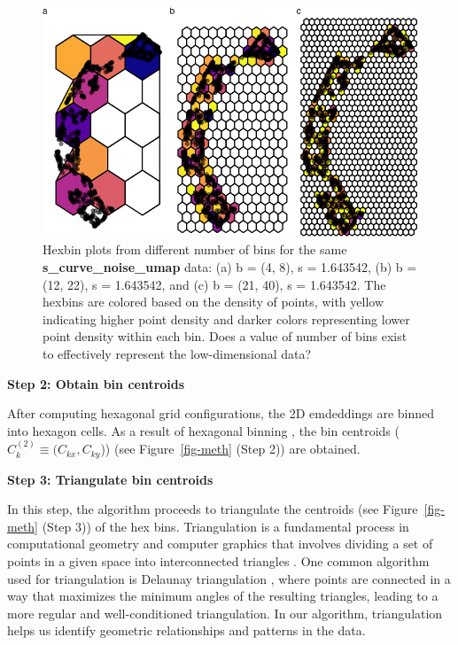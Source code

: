 \documentclass[
  12pt]{article}
\begin{document}
\begin{figure}[H]

{\centering \includegraphics{paper_files/figure-pdf/fig-binsize-1.pdf}

}

\caption{\label{fig-binsize}Hexbin plots from different number of bins
for the same \textbf{s\_curve\_noise\_umap} data: (a) b = (4, 8), s =
1.643542, (b) b = (12, 22), s = 1.643542, and (c) b = (21, 40), s =
1.643542. The hexbins are colored based on the density of points, with
yellow indicating higher point density and darker colors representing
lower point density within each bin. Does a value of number of bins
exist to effectively represent the low-dimensional data?}

\end{figure}

\textbf{Step 2: Obtain bin centroids}

After computing hexagonal grid configurations, the 2D emdeddings are
binned into hexagon cells. As a result of hexagonal binning , the bin
centroids (\(C_k^{(2)} \equiv (C_{kx}, C_{ky}\))) (see
Figure~\ref{fig-meth} (Step 2)) are obtained.

\textbf{Step 3: Triangulate bin centroids}

In this step, the algorithm proceeds to triangulate the centroids (see
Figure~\ref{fig-meth} (Step 3)) of the hex bins. Triangulation is a
fundamental process in computational geometry and computer graphics that
involves dividing a set of points in a given space into interconnected
triangles \citep{article30}. One common algorithm used for triangulation
is Delaunay triangulation \citep{article26}, where points are connected
in a way that maximizes the minimum angles of the resulting triangles,
leading to a more regular and well-conditioned triangulation. In our
algorithm, triangulation helps us identify geometric relationships and
patterns in the data.
\end{document}
